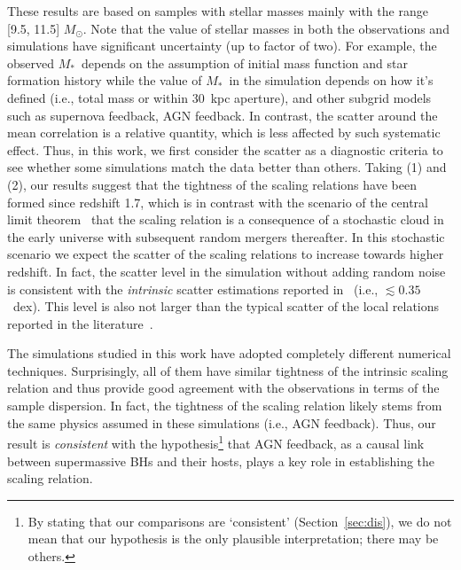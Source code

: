 \documentclass[twocolumn]{aastex631}
\def\smass{{$M_*$}}
\begin{document}
These results are based on samples with stellar masses mainly with the range [9.5, 11.5] $M_{\odot}$. Note that the value of stellar masses in both the observations and simulations have significant uncertainty (up to factor of two). For example, the observed \smass\ depends on the assumption of initial mass function and star formation history while the value of \smass\ in the simulation depends on how it's defined (i.e., total mass or within 30~kpc aperture), and other subgrid models such as supernova feedback, AGN feedback. In contrast, the scatter around the mean correlation is a relative quantity, which is less affected by such systematic effect. Thus, in this work, we first consider the scatter as a diagnostic criteria to see whether some simulations match the data better than others. Taking (1) and (2), our results suggest that the tightness of the scaling relations have been formed since redshift 1.7, which is in contrast with the scenario of the central limit theorem~\citep{Peng2007, Jahnke2011, Hirschmann2010} that the scaling relation is a consequence of a stochastic cloud in the early universe with subsequent random mergers thereafter. In this stochastic scenario we expect the scatter of the scaling relations to increase towards higher redshift. In fact, the scatter level in the simulation without adding random noise is consistent with the {\it intrinsic} scatter estimations reported in~\citet{Ding2020,Li2021b} (i.e., $\lesssim0.35$~dex). This level is also not larger than the typical scatter of the local relations reported in the literature~\citep{Kormendy13, Gul++09, Reines2015}.

The simulations studied in this work have adopted completely different numerical techniques. Surprisingly, all of them have similar tightness of the intrinsic scaling relation and thus provide good agreement with the observations in terms of the sample dispersion. In fact, the tightness of the scaling relation likely stems from the same physics assumed in these simulations (i.e., AGN feedback). Thus, our result is {\it consistent} with the hypothesis\footnote{By stating that our comparisons are `consistent' (Section~\ref{sec:dis}), we do not mean that our hypothesis is the only plausible interpretation; there may be others.} that AGN feedback, as a causal link between supermassive BHs and their hosts, plays a key role in establishing the scaling relation. 
\end{document}
